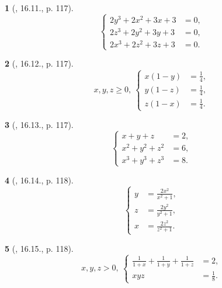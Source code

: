 \documentclass{article}
\newtheorem{baitoan}{}
\begin{document}
\begin{baitoan}[\cite{TLCT_THCS_Toan_9_dai_so}, 16.11., p. 117]
	\begin{equation*}
		\left\{\begin{split}
			2y^3 + 2x^2 + 3x + 3 &= 0,\\
			2z^3 + 2y^2 + 3y + 3 &= 0,\\
			2x^3 + 2z^2 + 3z + 3 &= 0.
		\end{split}\right.
	\end{equation*}
\end{baitoan}

\begin{baitoan}[\cite{TLCT_THCS_Toan_9_dai_so}, 16.12., p. 117]
	\begin{equation*}
		x,y,z\ge0,\ \left\{\begin{split}
			x(1 - y) &= \frac{1}{4},\\
			y(1 - z) &= \frac{1}{4},\\
			z(1 - x) &= \frac{1}{4}.
		\end{split}\right.
	\end{equation*}
\end{baitoan}

\begin{baitoan}[\cite{TLCT_THCS_Toan_9_dai_so}, 16.13., p. 117]
	\begin{equation*}
		\left\{\begin{split}
			x + y + z &= 2,\\
			x^2 + y^2 + z^2 &= 6,\\
			x^3 + y^3 + z^3 &= 8.
		\end{split}\right.
	\end{equation*}
\end{baitoan}

\begin{baitoan}[\cite{TLCT_THCS_Toan_9_dai_so}, 16.14., p. 118]
	\begin{equation*}
		\left\{\begin{split}
			y &= \frac{2x^2}{x^2 + 1},\\
			z &= \frac{2y^2}{y^2 + 1},\\
			x &= \frac{2z^2}{z^2 + 1}.
		\end{split}\right.
	\end{equation*}
\end{baitoan}

\begin{baitoan}[\cite{TLCT_THCS_Toan_9_dai_so}, 16.15., p. 118]
	\begin{equation*}
		x,y,z > 0,\ \left\{\begin{split}
			\frac{1}{1 + x} + \frac{1}{1 + y} + \frac{1}{1 + z} &= 2,\\
			xyz &= \frac{1}{8}.
		\end{split}\right.
	\end{equation*}
\end{baitoan}
\end{document}

